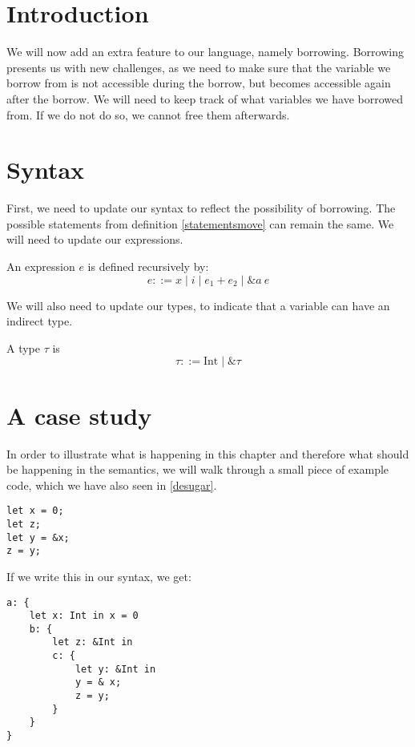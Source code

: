 \section{Introduction}
We will now add an extra feature to our language, namely borrowing. Borrowing presents us with new challenges, as we need to make sure that the variable we borrow from is not accessible during the borrow, but becomes accessible again after the borrow. We will need to keep track of what variables we have borrowed from. If we do not do so, we cannot free them afterwards. 

\section{Syntax}
First, we need to update our syntax to reflect the possibility of borrowing. The possible statements from definition \ref{statementsmove} can remain the same. We will need to update our expressions.

\begin{definition}
\label{expressionsborrow}
An expression $e$ is defined recursively by:
$$e ::= x \mid i \mid e_1 + e_2 \mid \&a~e$$
\end{definition}

We will also need to update our types, to indicate that a variable can have an indirect type.

\begin{definition}
\label{typesborrow}
A type $\tau$ is
$$\tau ::= \textrm{Int} \mid \& \tau$$
\end{definition}

\section{A case study}

In order to illustrate what is happening in this chapter and therefore what should be happening in the semantics, we will walk through a small piece of example code, which we have also seen in \ref{desugar}. 

\begin{verbatim}
let x = 0;
let z;
let y = &x;
z = y;
\end{verbatim}

If we write this in our syntax, we get: 

\begin{verbatim}
a: {
    let x: Int in x = 0
    b: {
        let z: &Int in 
        c: {
            let y: &Int in
            y = & x;
            z = y;
        }
    }
}
\end{verbatim} 

